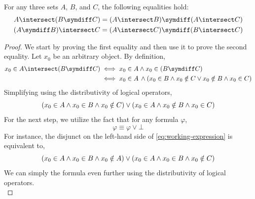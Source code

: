 \begin{thm}
    \label{set-identities:distributivity-of-intersection-over-symmetric-difference}
    For any three sets \( A \), \( B \), and \( C \), the following equalities hold:
    \begin{gather*}
        A \intersect (B \symdiff C)
        =
        \mleft( A \intersect B \mright) \symdiff \mleft( A \intersect C \mright)\\
        \mleft( A \symdiff B \mright) \intersect C
        =
        \mleft( A \intersect C \mright) \symdiff \mleft( B \intersect C \mright)
    \end{gather*}
\end{thm}

\begin{proof}
    We start by proving the first equality and then use it to prove the second equality.
    Let \( x_{0} \) be an arbitrary object. By definition,
    \begin{align*}
        x_{0} \in A \intersect \mleft( B \symdiff C \mright)
        &\iff
        x_{0} \in A \land x_{0} \in \mleft( B \symdiff C \mright)\\
        &\iff
        x_{0} \in A \, \land \mleft( x_{0} \in B \land x_{0} \notin C \lor x_{0} \notin B \land x_{0} \in C \mright)
    \end{align*}
    Simplifying using the distributivity of logical operators,
    \begin{equation}
        \label{eq:working-expression}
        \mleft( x_{0} \in A \land x_{0} \in B \land x_{0} \notin C \mright)
        \lor
        \mleft( x_{0} \in A \land x_{0} \notin B \land x_{0} \in C \mright)
    \end{equation}
    For the next step, we utilize the fact that for any formula \( \varphi \),
    \begin{equation*}
        \varphi \equiv \varphi \lor \bot
    \end{equation*}
    For instance, the disjunct on the left-hand side of \eqref{eq:working-expression} is equivalent
    to,
    \begin{equation*}
        \mleft( x_{0} \in A \land x_{0} \in B \land x_{0} \notin A \mright)
        \lor
        \mleft( x_{0} \in A \land x_{0} \in B \land x_{0} \notin C \mright)
    \end{equation*}
    We can simply the formula even further using the distributivity of logical operators.
    \begin{equation}

\end{equation}
\end{proof}
